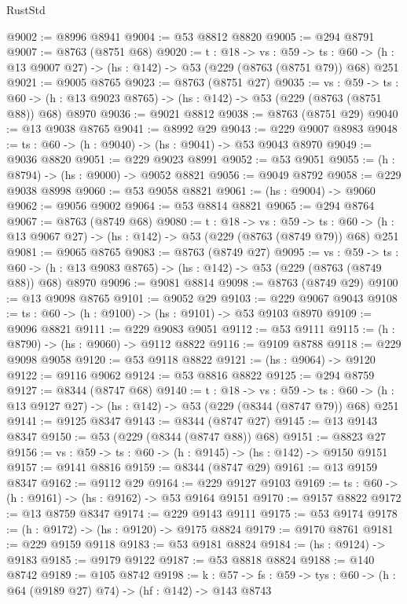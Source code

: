 \begin{lexlean}{RustStd}
\begin{coremodule}
@9002 := @8996 @8941
@9004 := @53 @8812 @8820
@9005 := @294 @8791
@9007 := @8763 (@8751 @68)
@9020 := {t : @18} ->
  {vs : @59} ->
  {ts : @60} -> (h : @13 @9007 @27) -> (hs : @142) -> @53 (@229 (@8763 (@8751 @79)) @68) @251
@9021 := @9005 @8765
@9023 := @8763 (@8751 @27)
@9035 := {vs : @59} ->
  {ts : @60} -> (h : @13 @9023 @8765) -> (hs : @142) -> @53 (@229 (@8763 (@8751 @88)) @68) @8970
@9036 := @9021 @8812
@9038 := @8763 (@8751 @29)
@9040 := @13 @9038 @8765
@9041 := @8992 @29
@9043 := @229 @9007 @8983
@9048 := {ts : @60} -> (h : @9040) -> (hs : @9041) -> @53 @9043 @8970
@9049 := @9036 @8820
@9051 := @229 @9023 @8991
@9052 := @53 @9051
@9055 := (h : @8794) -> (hs : @9000) -> @9052 @8821
@9056 := @9049 @8792
@9058 := @229 @9038 @8998
@9060 := @53 @9058 @8821
@9061 := (hs : @9004) -> @9060
@9062 := @9056 @9002
@9064 := @53 @8814 @8821
@9065 := @294 @8764
@9067 := @8763 (@8749 @68)
@9080 := {t : @18} ->
  {vs : @59} ->
  {ts : @60} -> (h : @13 @9067 @27) -> (hs : @142) -> @53 (@229 (@8763 (@8749 @79)) @68) @251
@9081 := @9065 @8765
@9083 := @8763 (@8749 @27)
@9095 := {vs : @59} ->
  {ts : @60} -> (h : @13 @9083 @8765) -> (hs : @142) -> @53 (@229 (@8763 (@8749 @88)) @68) @8970
@9096 := @9081 @8814
@9098 := @8763 (@8749 @29)
@9100 := @13 @9098 @8765
@9101 := @9052 @29
@9103 := @229 @9067 @9043
@9108 := {ts : @60} -> (h : @9100) -> (hs : @9101) -> @53 @9103 @8970
@9109 := @9096 @8821
@9111 := @229 @9083 @9051
@9112 := @53 @9111
@9115 := (h : @8790) -> (hs : @9060) -> @9112 @8822
@9116 := @9109 @8788
@9118 := @229 @9098 @9058
@9120 := @53 @9118 @8822
@9121 := (hs : @9064) -> @9120
@9122 := @9116 @9062
@9124 := @53 @8816 @8822
@9125 := @294 @8759
@9127 := @8344 (@8747 @68)
@9140 := {t : @18} ->
  {vs : @59} ->
  {ts : @60} -> (h : @13 @9127 @27) -> (hs : @142) -> @53 (@229 (@8344 (@8747 @79)) @68) @251
@9141 := @9125 @8347
@9143 := @8344 (@8747 @27)
@9145 := @13 @9143 @8347
@9150 := @53 (@229 (@8344 (@8747 @88)) @68)
@9151 := @8823 @27
@9156 := {vs : @59} -> {ts : @60} -> (h : @9145) -> (hs : @142) -> @9150 @9151
@9157 := @9141 @8816
@9159 := @8344 (@8747 @29)
@9161 := @13 @9159 @8347
@9162 := @9112 @29
@9164 := @229 @9127 @9103
@9169 := {ts : @60} -> (h : @9161) -> (hs : @9162) -> @53 @9164 @9151
@9170 := @9157 @8822
@9172 := @13 @8759 @8347
@9174 := @229 @9143 @9111
@9175 := @53 @9174
@9178 := (h : @9172) -> (hs : @9120) -> @9175 @8824
@9179 := @9170 @8761
@9181 := @229 @9159 @9118
@9183 := @53 @9181 @8824
@9184 := (hs : @9124) -> @9183
@9185 := @9179 @9122
@9187 := @53 @8818 @8824
@9188 := @140 @8742
@9189 := @105 @8742
@9198 := {k : @57} ->
  {fs : @59} -> {tys : @60} -> (h : @64 (@9189 @27) @74) -> (hf : @142) -> @143 @8743

\end{coremodule}
\end{lexlean}
